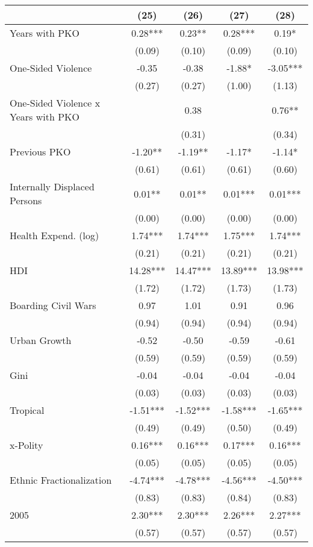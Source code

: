 \begin{table}[H]
\centering
\begin{tabular}[t]{lcccc}
\toprule
  & (25) & (26) & (27) & (28)\\
\midrule
Years with PKO & 0.28*** & 0.23** & 0.28*** & 0.19*\\
 & (0.09) & (0.10) & (0.09) & (0.10)\\
One-Sided Violence & -0.35 & -0.38 & -1.88* & -3.05***\\
 & (0.27) & (0.27) & (1.00) & (1.13)\\
One-Sided Violence x Years with PKO &  & 0.38 &  & 0.76**\\
 &  & (0.31) &  & (0.34)\\
Previous PKO & -1.20** & -1.19** & -1.17* & -1.14*\\
 & (0.61) & (0.61) & (0.61) & (0.60)\\
Internally Displaced Persons & 0.01** & 0.01** & 0.01*** & 0.01***\\
 & (0.00) & (0.00) & (0.00) & (0.00)\\
Health Expend. (log) & 1.74*** & 1.74*** & 1.75*** & 1.74***\\
 & (0.21) & (0.21) & (0.21) & (0.21)\\
HDI & 14.28*** & 14.47*** & 13.89*** & 13.98***\\
 & (1.72) & (1.72) & (1.73) & (1.73)\\
Boarding Civil Wars & 0.97 & 1.01 & 0.91 & 0.96\\
 & (0.94) & (0.94) & (0.94) & (0.94)\\
Urban Growth & -0.52 & -0.50 & -0.59 & -0.61\\
 & (0.59) & (0.59) & (0.59) & (0.59)\\
Gini & -0.04 & -0.04 & -0.04 & -0.04\\
 & (0.03) & (0.03) & (0.03) & (0.03)\\
Tropical & -1.51*** & -1.52*** & -1.58*** & -1.65***\\
 & (0.49) & (0.49) & (0.50) & (0.49)\\
x-Polity & 0.16*** & 0.16*** & 0.17*** & 0.16***\\
 & (0.05) & (0.05) & (0.05) & (0.05)\\
Ethnic Fractionalization & -4.74*** & -4.78*** & -4.56*** & -4.50***\\
 & (0.83) & (0.83) & (0.84) & (0.83)\\
2005 & 2.30*** & 2.30*** & 2.26*** & 2.27***\\
 & (0.57) & (0.57) & (0.57) & (0.57)\\

\end{tabular}
\end{table}
